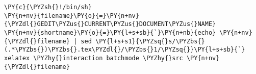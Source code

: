 \begin{Verbatim}[commandchars=\\\{\}]
\PY{c}{\PYZsh{}!/bin/sh}
\PY{n+nv}{filename}\PY{o}{=}\PY{n+nv}{\PYZdl{}GEDIT\PYZus{}CURRENT\PYZus{}DOCUMENT\PYZus{}NAME}
\PY{n+nv}{shortname}\PY{o}{=}\PY{l+s+sb}{`}\PY{n+nb}{echo} \PY{n+nv}{\PYZdl{}filename} | sed \PY{l+s+s1}{\PYZsq{}s/\PYZbs{}(.*\PYZbs{})\PYZbs{}.tex\PYZdl{}/\PYZbs{}1/\PYZsq{}}\PY{l+s+sb}{`}
xelatex \PYZhy{}interaction batchmode \PYZhy{}src \PY{n+nv}{\PYZdl{}filename}
\end{Verbatim}
